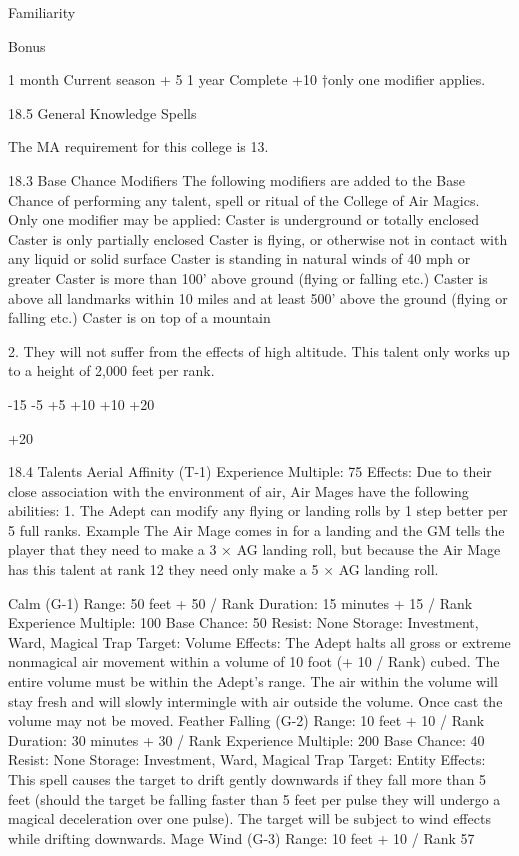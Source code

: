 \documentclass[a4paper]{article}
\begin{document}
\begin{multicols}{3}
Familiarity

Bonus

1 month Current season + 5%
1 year
Complete
+10%
†only one modifier applies.

18.5 General Knowledge Spells

The MA requirement for this college is 13.

18.3 Base Chance Modifiers
The following modifiers are added to the Base
Chance of performing any talent, spell or ritual of
the College of Air Magics. Only one modifier may
be applied:
Caster is underground or totally enclosed
Caster is only partially enclosed
Caster is flying, or otherwise not in contact
with any liquid or solid surface
Caster is standing in natural winds of 40 mph
or greater
Caster is more than 100’ above ground (flying or falling etc.)
Caster is above all landmarks within 10 miles
and at least 500’ above the ground (flying or
falling etc.)
Caster is on top of a mountain

2. They will not suffer from the effects of high
altitude. This talent only works up to a height of
2,000 feet per rank.

-15
-5
+5
+10
+10
+20

+20

18.4 Talents
Aerial Affinity (T-1)
Experience Multiple: 75
Effects: Due to their close association with the
environment of air, Air Mages have the following
abilities:
1. The Adept can modify any flying or landing
rolls by 1 step better per 5 full ranks.
Example
The Air Mage comes in for a landing and
the GM tells the player that they need to make a 3 × AG
landing roll, but because the Air Mage has this talent at
rank 12 they need only make a 5 × AG landing roll.

Calm (G-1)
Range: 50 feet + 50 / Rank
Duration: 15 minutes + 15 / Rank
Experience Multiple: 100
Base Chance: 50%
Resist: None
Storage: Investment, Ward, Magical Trap
Target: Volume
Effects: The Adept halts all gross or extreme nonmagical air movement within a volume of 10 foot
(+ 10 / Rank) cubed. The entire volume must be
within the Adept’s range. The air within the volume will stay fresh and will slowly intermingle
with air outside the volume. Once cast the volume
may not be moved.
Feather Falling (G-2)
Range: 10 feet + 10 / Rank
Duration: 30 minutes + 30 / Rank
Experience Multiple: 200
Base Chance: 40%
Resist: None
Storage: Investment, Ward, Magical Trap
Target: Entity
Effects: This spell causes the target to drift gently
downwards if they fall more than 5 feet (should the
target be falling faster than 5 feet per pulse they
will undergo a magical deceleration over one
pulse). The target will be subject to wind effects
while drifting downwards.
Mage Wind (G-3)
Range: 10 feet + 10 / Rank
57


\end{multicols}
\end{document}
